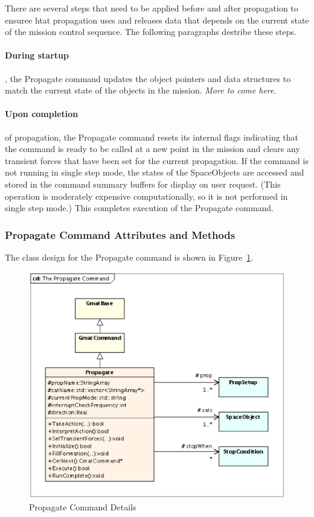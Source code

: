 There are several steps that need to be applied before and after propagation to ensuree htat
propagation uses and releases data that depends on the current state of the mission control
sequence.  The following paragraphs destribe these steps.

\paragraph{During startup}, the Propagate command updates the object pointers and data structures to
match the current state of the objects in the mission.  \textit{More to come here.}

\paragraph{Upon completion} of propagation, the Propagate command resets its internal flags
indicating that the command is ready to be called at a new point in the mission and clears any
transient forces that have been set for the current propagation.  If the command is not running in
single step mode, the states of the SpaceObjects are accessed and stored in the command summary
buffers for display on user request.  (This operation is moderately expensive computationally, so it
is not performed in single step mode.)  This completes execution of the Propagate command.

\subsubsection{Propagate Command Attributes and Methods}

The class design for the Propagate command is shown in Figure~\ref{figure:PropagateCommand}.

\begin{figure}[htb]
\begin{center}
\includegraphics[scale=0.5]{Images/ThePropagateCommand.eps}
\caption{\label{figure:PropagateCommand}Propagate Command Details}
\end{center}
\end{figure}

